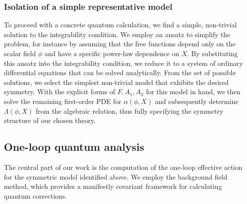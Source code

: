 \documentclass[twocolumn]{aastex631}
\begin{document}
\subsubsection{Isolation of a simple representative model}
To proceed with a concrete quantum calculation, we find a simple, non-trivial solution to the integrability condition. We employ an ansatz to simplify the problem, for instance by assuming that the free functions depend only on the scalar field $\phi$ and have a specific power-law dependence on $X$. By substituting this ansatz into the integrability condition, we reduce it to a system of ordinary differential equations that can be solved analytically. From the set of possible solutions, we select the simplest non-trivial model that exhibits the desired symmetry. With the explicit forms of $F, A_1, A_3$ for this model in hand, we then solve the remaining first-order PDE for $\alpha(\phi, X)$ and subsequently determine $\Lambda(\phi, X)$ from the algebraic relation, thus fully specifying the symmetry structure of our chosen theory.

\subsection{One-loop quantum analysis}
The central part of our work is the computation of the one-loop effective action for the symmetric model identified above. We employ the background field method, which provides a manifestly covariant framework for calculating quantum corrections.
\end{document}
